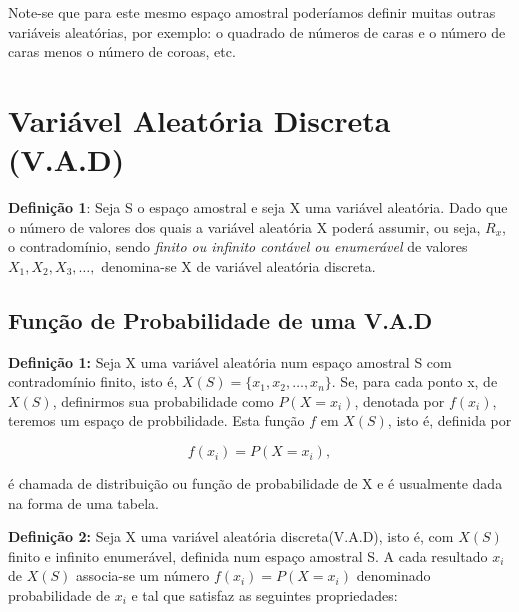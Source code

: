 \documentclass[a4paper,12pt]{report}
\begin{document}
{Note-se que para este mesmo espaço amostral poderíamos definir
muitas outras variáveis aleatórias, por exemplo: o quadrado de
números de caras e o número de caras menos o número de coroas,
etc.


\section{Variável Aleatória Discreta (V.A.D)}

\textbf{Definição 1}: Seja S o espaço amostral e seja X uma
variável aleatória. Dado que o número de valores dos quais a
variável aleatória X poderá assumir, ou seja, $R_{x}$, o
contradomínio, sendo\emph{ finito ou infinito contável ou
enumerável} de valores $X_{1}, X_{2}, X_{3}, \ldots,$ denomina-se
X de variável aleatória discreta.

\subsection{Função de Probabilidade de uma V.A.D}

\textbf{Definição 1:} Seja X uma variável aleatória num espaço
amostral S com contradomínio finito, isto é, $X(S)=\{x_{1}, x_{2},
\ldots, x_{n} \}$. Se, para cada ponto x, de $X(S)$, definirmos
sua probabilidade como $P(X=x_{i})$, denotada por $f(x_{i})$,
teremos um espaço de probbilidade. Esta função $f$ em $X(S)$, isto
é, definida por


\begin{equation}\label{}
f(x_{i})=P(X=x_{i}),
\end{equation}

é chamada de distribuição ou função de probabilidade de X e é
usualmente dada na forma de uma tabela.


\begin{table}[!htb]
\end{table}

\textbf{Definição 2:} Seja X uma variável aleatória
discreta(V.A.D), isto é, com $X(S)$ finito e infinito enumerável,
definida num espaço amostral S. A cada resultado $x_{i}$ de $X(S)$
associa-se um número $f(x_{i})=P(X=x_{i})$ denominado
probabilidade de $x_{i}$ e tal que satisfaz as seguintes
propriedades:


}
\end{document}
